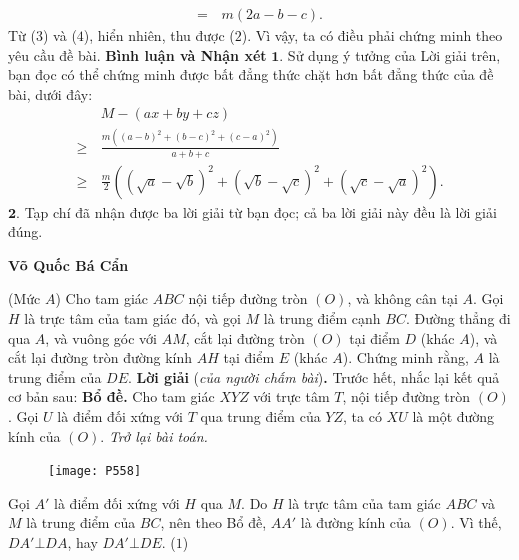 \begin{multicols}{2}
\begin{align*}
		=\,& m\left( {2a - b - c} \right). \tag{$4$}
	\end{align*}
	Từ ($3$) và ($4$), hiển nhiên, thu được ($2$). Vì vậy, ta có điều phải chứng minh theo yêu cầu đề bài.
	\vskip 0.05cm
	\textbf{\color{thachthuctoanhoc}Bình luận và Nhận xét}
	\vskip 0.05cm
	$\pmb{1.}$ Sử dụng ý tưởng của Lời giải trên, bạn đọc có thể chứng minh được bất đẳng thức chặt hơn bất đẳng thức của đề bài, dưới đây:
	\begin{align*}
		&M - (ax + by + cz)\\
		 \ge\,& \frac{{m\left( {{{(a - b)}^2} + {{(b - c)}^2} + {{(c - a)}^2}} \right)}}{{a + b + c}} \\
		\ge\,& \frac{m}{2}\!\!\left(\!\!(\!\sqrt a  \!-\! \sqrt b)^2 \!\!+\!\! (\!\sqrt b  \!-\!\! \sqrt c)^2 \!\!+\!\! (\!\sqrt c  \!-\! \sqrt a)^2\!\!\right)\!\!.
	\end{align*}
	$\pmb{2.}$ Tạp chí đã nhận được ba lời giải từ bạn đọc; cả ba lời giải này đều là lời giải đúng.
	\begin{flushright}
		\textbf{\color{thachthuctoanhoc}Võ Quốc Bá Cẩn}
	\end{flushright}
	{}
	(Mức $A$) Cho tam giác $ABC$ nội tiếp đường tròn $(O)$, và không cân tại $A$. Gọi $H$ là trực tâm của tam giác đó, và gọi $M$ là trung điểm cạnh $BC$. Đường thẳng đi qua $A$, và vuông góc với $AM$, cắt lại đường tròn $(O)$ tại điểm $D$ (khác $A$), và cắt lại đường tròn đường kính $AH$ tại điểm $E$ (khác $A$). Chứng minh rằng, $A$ là trung điểm của $DE$.
	\vskip
	 0.05cm
	\textbf{\color{thachthuctoanhoc}Lời giải} (\textit{của người chấm bài})\textbf{\color{thachthuctoanhoc}.}
	\vskip 0.05cm
	Trước hết, nhắc lại kết quả cơ bản sau:
	\vskip 0.05cm
	\textbf{\color{thachthuctoanhoc}Bổ đề.} Cho tam giác $XYZ$ với trực tâm $T$, nội tiếp đường tròn $(O)$. Gọi $U$ là điểm đối xứng với $T$ qua trung điểm của $YZ$, ta có $XU$ là một đường kính của $(O)$.
	\vskip 0.05cm
	\textit{Trở lại bài toán.}
		\begin{figure}[H]
		\vspace*{-5pt}
		\centering
		\captionsetup{labelformat= empty, justification=centering}
		\texttt{[image: P558]}
		\vspace*{-10pt}
	\end{figure}
	Gọi $A'$  là điểm đối xứng với $H$ qua $M$.
	\vskip 0.05cm
	Do $H$ là trực tâm của tam giác $ABC$ và $M$ là trung điểm của $BC$, nên theo Bổ đề, $AA'$ là đường kính của $(O)$. Vì thế,  $DA' \bot DA$, hay $DA' \bot DE$. \hfill                              ($1$)

\end{multicols}
